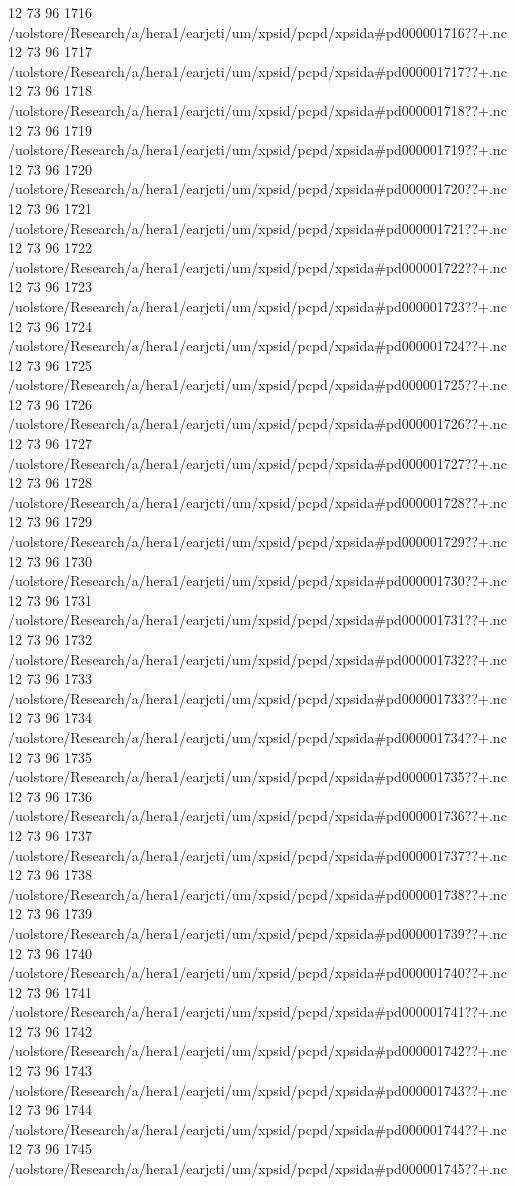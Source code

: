 12 73 96
1716
/uolstore/Research/a/hera1/earjcti/um/xpsid/pcpd/xpsida#pd000001716??+.nc
12 73 96
1717
/uolstore/Research/a/hera1/earjcti/um/xpsid/pcpd/xpsida#pd000001717??+.nc
12 73 96
1718
/uolstore/Research/a/hera1/earjcti/um/xpsid/pcpd/xpsida#pd000001718??+.nc
12 73 96
1719
/uolstore/Research/a/hera1/earjcti/um/xpsid/pcpd/xpsida#pd000001719??+.nc
12 73 96
1720
/uolstore/Research/a/hera1/earjcti/um/xpsid/pcpd/xpsida#pd000001720??+.nc
12 73 96
1721
/uolstore/Research/a/hera1/earjcti/um/xpsid/pcpd/xpsida#pd000001721??+.nc
12 73 96
1722
/uolstore/Research/a/hera1/earjcti/um/xpsid/pcpd/xpsida#pd000001722??+.nc
12 73 96
1723
/uolstore/Research/a/hera1/earjcti/um/xpsid/pcpd/xpsida#pd000001723??+.nc
12 73 96
1724
/uolstore/Research/a/hera1/earjcti/um/xpsid/pcpd/xpsida#pd000001724??+.nc
12 73 96
1725
/uolstore/Research/a/hera1/earjcti/um/xpsid/pcpd/xpsida#pd000001725??+.nc
12 73 96
1726
/uolstore/Research/a/hera1/earjcti/um/xpsid/pcpd/xpsida#pd000001726??+.nc
12 73 96
1727
/uolstore/Research/a/hera1/earjcti/um/xpsid/pcpd/xpsida#pd000001727??+.nc
12 73 96
1728
/uolstore/Research/a/hera1/earjcti/um/xpsid/pcpd/xpsida#pd000001728??+.nc
12 73 96
1729
/uolstore/Research/a/hera1/earjcti/um/xpsid/pcpd/xpsida#pd000001729??+.nc
12 73 96
1730
/uolstore/Research/a/hera1/earjcti/um/xpsid/pcpd/xpsida#pd000001730??+.nc
12 73 96
1731
/uolstore/Research/a/hera1/earjcti/um/xpsid/pcpd/xpsida#pd000001731??+.nc
12 73 96
1732
/uolstore/Research/a/hera1/earjcti/um/xpsid/pcpd/xpsida#pd000001732??+.nc
12 73 96
1733
/uolstore/Research/a/hera1/earjcti/um/xpsid/pcpd/xpsida#pd000001733??+.nc
12 73 96
1734
/uolstore/Research/a/hera1/earjcti/um/xpsid/pcpd/xpsida#pd000001734??+.nc
12 73 96
1735
/uolstore/Research/a/hera1/earjcti/um/xpsid/pcpd/xpsida#pd000001735??+.nc
12 73 96
1736
/uolstore/Research/a/hera1/earjcti/um/xpsid/pcpd/xpsida#pd000001736??+.nc
12 73 96
1737
/uolstore/Research/a/hera1/earjcti/um/xpsid/pcpd/xpsida#pd000001737??+.nc
12 73 96
1738
/uolstore/Research/a/hera1/earjcti/um/xpsid/pcpd/xpsida#pd000001738??+.nc
12 73 96
1739
/uolstore/Research/a/hera1/earjcti/um/xpsid/pcpd/xpsida#pd000001739??+.nc
12 73 96
1740
/uolstore/Research/a/hera1/earjcti/um/xpsid/pcpd/xpsida#pd000001740??+.nc
12 73 96
1741
/uolstore/Research/a/hera1/earjcti/um/xpsid/pcpd/xpsida#pd000001741??+.nc
12 73 96
1742
/uolstore/Research/a/hera1/earjcti/um/xpsid/pcpd/xpsida#pd000001742??+.nc
12 73 96
1743
/uolstore/Research/a/hera1/earjcti/um/xpsid/pcpd/xpsida#pd000001743??+.nc
12 73 96
1744
/uolstore/Research/a/hera1/earjcti/um/xpsid/pcpd/xpsida#pd000001744??+.nc
12 73 96
1745
/uolstore/Research/a/hera1/earjcti/um/xpsid/pcpd/xpsida#pd000001745??+.nc
